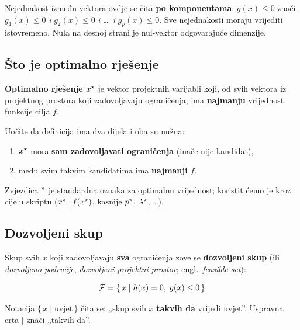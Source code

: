 \begin{napomena}
Nejednakost između vektora ovdje se čita \textbf{po komponentama}:
$g(x) \le 0$ znači $g_1(x) \le 0$ \emph{i} $g_2(x) \le 0$ \emph{i} \dots\
\emph{i} $g_p(x) \le 0$. Sve nejednakosti moraju vrijediti istovremeno. Nula na
desnoj strani je nul-vektor odgovarajuće dimenzije.
\end{napomena}

\subsection{Što je optimalno rješenje}

\begin{definicija}
\textbf{Optimalno rješenje $x^{\star}$} je vektor projektnih varijabli koji, od
svih vektora iz projektnog prostora koji zadovoljavaju ograničenja, ima
\textbf{najmanju} vrijednost funkcije cilja $f$.
\end{definicija}

Uočite da definicija ima dva dijela i oba su nužna:

\begin{enumerate}
  \item $x^{\star}$ mora \textbf{sam zadovoljavati ograničenja} (inače nije
        kandidat),
  \item među svim takvim kandidatima ima \textbf{najmanji} $f$.
\end{enumerate}

Zvjezdica $^{\star}$ je standardna oznaka za optimalnu vrijednost; koristit ćemo je
kroz cijelu skriptu ($x^{\star}$, $f(x^{\star})$, kasnije $p^{\star}$, $\lambda^{\star}$,
\dots).

\subsection{Dozvoljeni skup}

Skup svih $x$ koji zadovoljavaju \textbf{sva} ograničenja zove se
\textbf{dozvoljeni skup} (ili \emph{dozvoljeno područje}, \emph{dozvoljeni
projektni prostor}; engl.\ \emph{feasible set}):

\begin{definicija}
\begin{equation}
\mathcal{F} = \{\, x \mid h(x) = 0, \; g(x) \le 0 \,\}
\end{equation}
\end{definicija}

Notacija $\{\, x \mid \text{uvjet} \,\}$ čita se: „skup svih $x$ \textbf{takvih
da} vrijedi uvjet”. Uspravna crta $\mid$ znači „takvih da”.


